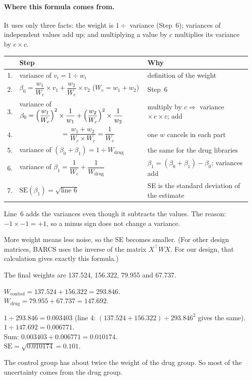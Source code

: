 \paragraph{Where this formula comes from.} It uses only three facts:
the weight is $1 \div$ variance (Step~6); variances of independent values
add up; and multiplying a value by $c$ multiplies its variance by
$c \times c$.

\begin{center}
\small
\renewcommand{\arraystretch}{1.45}\setlength{\tabcolsep}{4pt}
\begin{tabular}{@{}r@{\;}l l@{}}
\toprule
& \textbf{Step} & \textbf{Why}\\
\midrule
1. & variance of $v_i = 1 \div w_i$ & definition of the weight\\
2. & $\beta_0 = \dfrac{w_1}{W_c} \times v_1 + \dfrac{w_2}{W_c} \times v_2$ \quad ($W_c = w_1 + w_2$) & Step~6\\
3. & variance of $\beta_0 = \Bigl(\dfrac{w_1}{W_c}\Bigr)^2 \times \dfrac{1}{w_1} + \Bigl(\dfrac{w_2}{W_c}\Bigr)^2 \times \dfrac{1}{w_2}$ & multiply by $c \Rightarrow$ variance $\times\, c \times c$; add\\
4. & $\phantom{\text{variance of }\beta_0} = \dfrac{w_1 + w_2}{W_c \times W_c} = \dfrac{1}{W_c}$ & one $w$ cancels in each part\\
5. & variance of $(\beta_0 + \beta_1) = 1 \div W_{\text{drug}}$ & the same for the drug libraries\\
6. & variance of $\beta_1 = \dfrac{1}{W_c} + \dfrac{1}{W_{\text{drug}}}$ & $\beta_1 = (\beta_0 + \beta_1) - \beta_0$; variances add\\
7. & $\text{SE}(\beta_1) = \sqrt{\text{line 6}}$ & SE is the standard deviation of the estimate\\
\bottomrule
\end{tabular}
\end{center}

Line~6 adds the variances even though it subtracts the values. The reason:
$-1 \times -1 = +1$, so a minus sign does not change a variance.

More weight means less noise, so the SE becomes smaller. (For other design
matrices, BARCS uses the inverse of the matrix $X^{\top} W X$. For our design,
that calculation gives exactly this formula.)

\begin{worked}
The final weights are 137.524, 156.322, 79.955 and 67.737.

$W_{\text{control}} = 137.524 + 156.322 = 293.846$.\\
$W_{\text{drug}} = 79.955 + 67.737 = 147.692$.

$1 \div 293.846 = 0.003403$ (line 4: $(137.524 + 156.322) \div 293.846^2$ gives the same).\\
$1 \div 147.692 = 0.006771$.\\
Sum: $0.003403 + 0.006771 = 0.010174$.\\
$\text{SE} = \sqrt{0.010174} = 0.101$.

The control group has about twice the weight of the drug group. So most of
the uncertainty comes from the drug group.
\end{worked}


